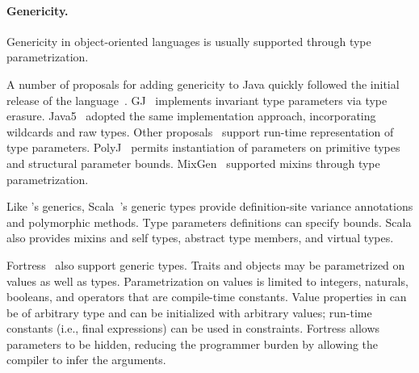 

\paragraph{Genericity.}

Genericity in object-oriented languages is usually
supported through
type parametrization.

A number of proposals 
for adding genericity to Java quickly followed
the initial release of
the language~\cite{GJ,java-popl97,thorup97,allen03}.
GJ~\cite{GJ} implements invariant type
parameters via type erasure.  Java5~\cite{Java3} adopted the same
implementation approach, incorporating wildcards and raw types.
Other proposals~\cite{java-popl97,nextgen,reflective-generics,type-passing-generics} support run-time representation of type parameters.
PolyJ~\cite{java-popl97} permits instantiation of
parameters on primitive types and structural parameter bounds.
MixGen~\cite{allen03} supported mixins through type parametrization.

Like \Xten's generics, Scala~\cite{scala}'s generic types provide
definition-site variance annotations and polymorphic methods.  Type parameters
definitions can specify bounds.  Scala also provides mixins and self types,
abstract type members, and virtual types.

Fortress~\cite{fortress} also support generic types.  Traits and objects may be
parametrized on values as well as types.  Parametrization on values is
limited to integers, naturals, booleans, and operators that are compile-time
constants.  Value properties in \Xten can be of arbitrary type and can be
initialized with arbitrary values; run-time constants (i.e., final expressions)
can be used in constraints.  Fortress allows parameters to be hidden, reducing
the programmer burden by allowing the compiler to infer the arguments.

